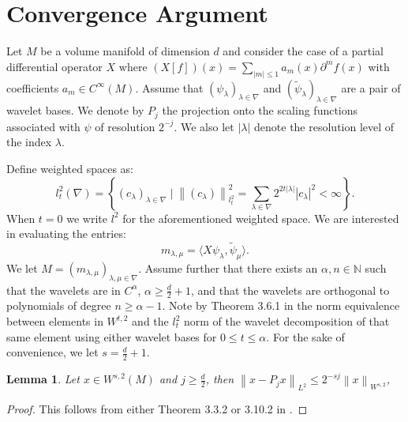 \documentclass[12pt]{amsart}
\title{}
\author{}
\date{} %
\newtheorem{lemma}{Lemma}
\newcommand{\N}{\mathbb{N}}
\newcommand{\card}[1]{{\lvert#1\rvert}}
\newcommand{\abs}[1]{\ensuremath{\left\lvert #1\right\rvert}}
\newcommand{\norm}[1]{\ensuremath{\left\lVert #1\right\rVert}}
\begin{document}
\section{Convergence Argument}

Let $M$ be a volume manifold of dimension $d$ and consider the case of a partial differential operator $X$ where $(X [f] )(x) = \sum_{\abs{m}\leq 1} a_m(x) \partial^m f(x)$ with coefficients $a_m \in C^{\infty}(M)$. Assume that $(\psi_\lambda)_{\lambda \in \nabla}$ and $(\tilde{\psi}_\lambda)_{\lambda \in \nabla}$ are a pair of wavelet bases. We denote by $P_j$ the projection onto the scaling functions associated with $\psi$ of resolution $2^{-j}$. We also let $\card{\lambda}$ denote the resolution level of the index $\lambda$. 

Define weighted spaces as:
\begin{equation}
	l_t^2(\nabla) = \left\{ (c_\lambda)_{\lambda\in\nabla} \mid \norm{(c_\lambda)}_{l^2_t}^2 = \sum_{\lambda \in \nabla} 2^{2t\card{\lambda}}\abs{c_\lambda}^2 < \infty  \right\}.
\end{equation}
When $t = 0$ we write $l^2$ for the aforementioned weighted space. We are interested in evaluating the entries:
\begin{equation}
	m_{\lambda,\mu} = \langle X \psi_\lambda, \tilde{\psi}_\mu \rangle.
\end{equation}
We let $M=(m_{\lambda,\mu})_{\lambda,\mu \in \nabla}$. Assume further that there exists an $\alpha,n \in \N$ such that the wavelets are in $C^{\alpha}$, $\alpha \geq \frac{d}{2} + 1$, and that the wavelets are orthogonal to polynomials of degree $n \geq \alpha - 1$.  Note by Theorem 3.6.1 in \cite{} the norm equivalence between elements in $W^{t,2}$ and the $l_t^2$ norm of the wavelet decomposition of that same element using either wavelet bases for $0\leq t \leq \alpha$. For the sake of convenience, we let $s = \frac{d}{2} + 1$. 

\begin{lemma} \label{lem:projection_bound}
	Let $x \in W^{s,2}(M)$ and $j \geq \frac{d}{2}$, then $\norm{x - P_j x}_{L^2} \leq  2^{-sj}\norm{x}_{W^{s,2}}$,
\end{lemma}
\begin{proof}
	This follows from either Theorem 3.3.2 or 3.10.2 in \cite{}.
\end{proof}
\end{document}
